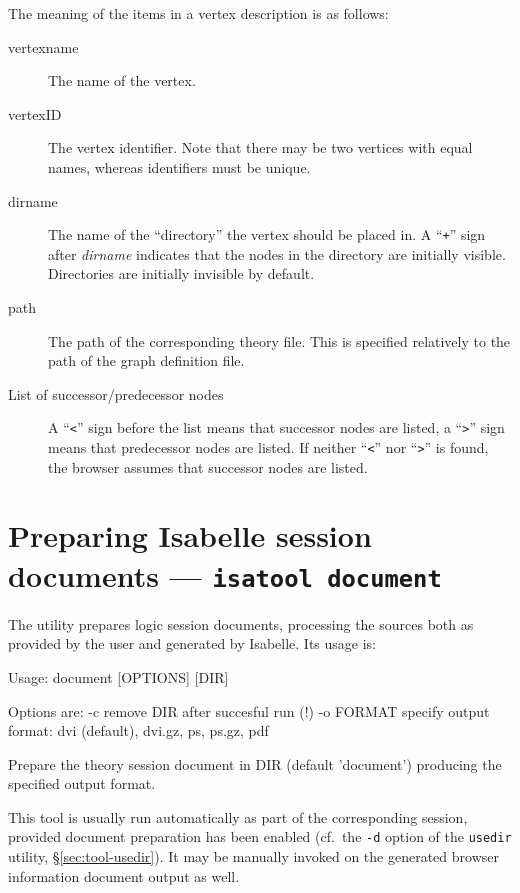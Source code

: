 The meaning of the items in a vertex description is as follows:
\begin{description}
  
\item[vertexname] The name of the vertex.
  
\item[vertexID] The vertex identifier. Note that there may be two
  vertices with equal names, whereas identifiers must be unique.
  
\item[dirname] The name of the ``directory'' the vertex should be
  placed in.  A ``{\tt +}'' sign after {\it dirname} indicates that
  the nodes in the directory are initially visible. Directories are
  initially invisible by default.
  
\item[path] The path of the corresponding theory file. This is
  specified relatively to the path of the graph definition file.
  
\item[List of successor/predecessor nodes] A ``{\tt <}'' sign before
  the list means that successor nodes are listed, a ``{\tt >}'' sign
  means that predecessor nodes are listed. If neither ``{\tt <}'' nor
  ``{\tt >}'' is found, the browser assumes that successor nodes are
  listed.

\end{description}


\section{Preparing Isabelle session documents --- \texttt{isatool document}}
\label{sec:tool-document}

The  utility prepares logic session documents, processing the
sources both as provided by the user and generated by Isabelle.  Its usage is:
\begin{ttbox}
Usage: document [OPTIONS] [DIR]

  Options are:
    -c           remove DIR after succesful run (!)
    -o FORMAT    specify output format: dvi (default), dvi.gz, ps,
                 ps.gz, pdf

  Prepare the theory session document in DIR (default 'document')
  producing the specified output format.
\end{ttbox}
This tool is usually run automatically as part of the corresponding session,
provided document preparation has been enabled (cf.\ the \texttt{-d} option of
the \texttt{usedir} utility, \S\ref{sec:tool-usedir}).  It may be manually
invoked on the generated browser information document output as well.

